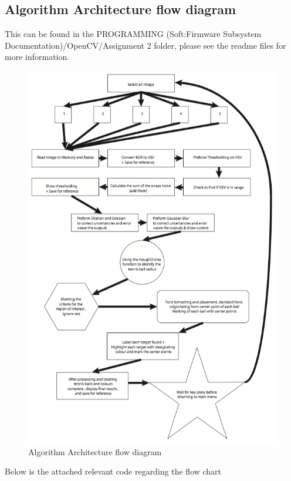 \documentclass[a4paper, 10pt]{IEEEconf}
\begin{document}

\subsection{Algorithm Architecture flow diagram}
This can be found in the PROGRAMMING (Soft:Firmware Subsystem Documentation)/OpenCV/Assignment 2 folder, please see the readme files for more information.
\begin{figure}[H]
  \includegraphics[width=0.7\linewidth, center]{images/AA}
  \caption{Algorithm Architecture flow diagram}
  \label{fig:Algorithm Architecture flow diagram}
\end{figure}
Below is the attached relevant code regarding the flow chart


\clearpage
\onecolumn
\end{document}
